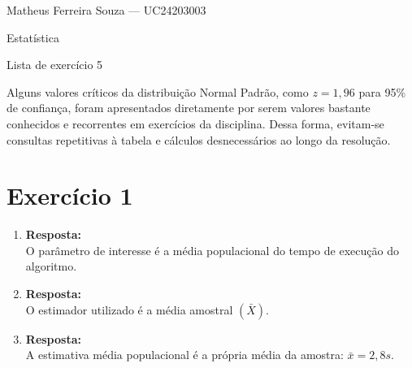 \documentclass[11pt, a4paper]{article}
\begin{document}
\hfill Matheus Ferreira Souza — UC24203003

\hfill Estatística

\hfill Lista de exercício 5

\begin{tcolorbox}[colback=gray!10, colframe=black, title=Observação:]
Alguns valores críticos da distribuição Normal Padrão, como $z=1,96$ para
95\% de confiança, foram apresentados diretamente por serem valores bastante
conhecidos e recorrentes em exercícios da disciplina. Dessa forma, evitam-se
consultas repetitivas à tabela e cálculos desnecessários ao longo da resolução.
\end{tcolorbox}

\vspace{1em}

\section{Exercício 1}
\begin{enumerate}[label=\alph*)]
    \item \textbf{Resposta:}\\
    O parâmetro de interesse é a média populacional do tempo de execução do algoritmo.
    
    \item \textbf{Resposta:}\\
    O estimador utilizado é a média amostral $(\bar{X})$.
    
    \item \textbf{Resposta:}\\
    A estimativa média populacional é a própria média da amostra: $\bar{x} = 2,8s$.
\end{enumerate}                   
\end{document}
